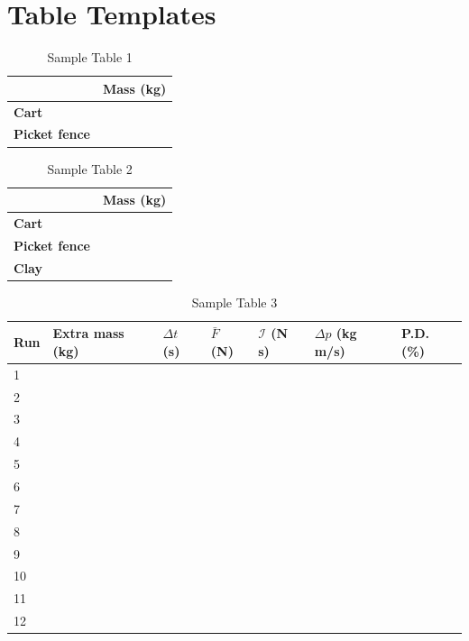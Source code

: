\section{Table Templates}
%
\begin{table}[ht!]
    \begin{center}
        \begin{tabular}{l | l}
            & \textbf{Mass} (kg) \\
            \hline
            \textbf{Cart} & \\
            \textbf{Picket fence} & \\
            \hline
        \end{tabular}
    \end{center}
    \caption{Sample Table 1}
\end{table}
%
\begin{table}[ht!]
    \begin{center}
        \begin{tabular}{l | l}
            & \textbf{Mass} (kg) \\
            \hline
            \textbf{Cart} & \\
            \textbf{Picket fence} & \\
            \textbf{Clay} & \\
            \hline
        \end{tabular}
    \end{center}
    \caption{Sample Table 2}
\end{table}
%
\begin{table}[ht!]
    \begin{center}
        \begin{tabular}{l | l | l | l | l | l | l}
            \textbf{Run} & \textbf{Extra mass} (kg) & $\Delta t$ (s) & $\bar{F}$ (N) & $\mathcal{I}$ (N s) & $\Delta p$ (kg m/s) & \textbf{P.D.} (\%) \\
            \hline
            1 & & & & & & \\
            2 & & & & & & \\
            3 & & & & & & \\
            \hline
            4 & & & & & & \\
            5 & & & & & & \\
            6 & & & & & & \\
            \hline
            7 & & & & & & \\
            8 & & & & & & \\
            9 & & & & & & \\
            \hline
            10 & & & & & & \\
            11 & & & & & & \\
            12 & & & & & & \\
            \hline
        \end{tabular}
    \end{center}
    \caption{Sample Table 3}
\end{table}
%
\newpage
